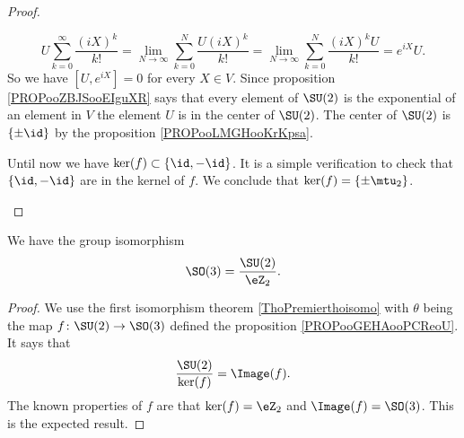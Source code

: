 \begin{proof}
\begin{subproof}
            \begin{equation}
                U\sum_{k=0}^{\infty}\frac{ (iX)^k }{ k! }=\lim_{N\to \infty} \sum_{k=0}^N\frac{ U(iX)^k }{ k! }=\lim_{N\to \infty} \sum_{k=0}^N\frac{ (iX)^kU }{ k! }= e^{iX}U.
            \end{equation}
            So we have \( [U, e^{iX}]=0\) for every \( X\in V\). Since proposition \ref{PROPooZBJSooEIguXR} says that every element of \( \SU(2)\) is the exponential of an element in \( V\) the element \( U\) is in the center of \( \SU(2)\). The center of \( \SU(2)\) is \( \{ \pm\id \}\) by the proposition \ref{PROPooLMGHooKrKpsa}.

            Until now we have \( \ker(f)\subset \{ \id,-\id \}\). It is a simple verification to check that \( \{ \id,-\id \}\) are in the kernel of \( f\). We conclude that \( \ker(f)=\{ \pm\mtu_2 \}\).
    \end{subproof}
\end{proof}

\begin{proposition}     \label{PROPooDKPTooBnLflt}
    We have the group isomorphism
    \begin{equation}
        \SO(3)=\frac{ \SU(2) }{ \eZ_2 }.
    \end{equation}
\end{proposition}

\begin{proof}
    We use the first isomorphism theorem \ref{ThoPremierthoisomo} with \( \theta\) being the map \( f\colon \SU(2)\to \SO(3)\) defined the proposition \ref{PROPooGEHAooPCReoU}. It says that
    \begin{equation}
        \frac{ \SU(2) }{ \ker(f) }=\Image(f).
    \end{equation}
    The known properties of \( f\) are that \( \ker(f)=\eZ_2\) and \( \Image(f)=\SO(3)\). This is the expected result.
\end{proof}


